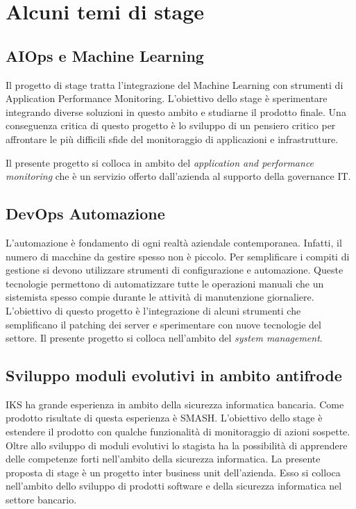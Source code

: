 \section{Alcuni temi di stage}
\subsection{AIOps e Machine Learning}
Il progetto di stage tratta l'integrazione del Machine Learning con 
strumenti di Application Performance Monitoring. L'obiettivo dello 
stage è sperimentare integrando diverse soluzioni in questo ambito e 
studiarne il prodotto finale. Una conseguenza critica di questo progetto 
è lo sviluppo di un pensiero critico per affrontare le più difficili sfide 
del monitoraggio di applicazioni e infrastrutture. 

Il presente progetto si colloca in ambito del \textit{application and performance monitoring} che è un servizio offerto dall'azienda al supporto della governance IT.


\subsection{DevOps Automazione}
L'automazione è fondamento di ogni realtà aziendale contemporanea. Infatti, 
il numero di macchine da gestire spesso non è piccolo. Per semplificare i 
compiti di gestione si devono utilizzare strumenti di configurazione e
automazione. Queste tecnologie permettono di automatizzare tutte le operazioni 
manuali che un sistemista spesso compie durante le attività di manutenzione 
giornaliere. L'obiettivo di questo progetto è l'integrazione di alcuni strumenti che semplificano il \gls{patching} dei server e sperimentare con nuove tecnologie del settore.
Il presente progetto si colloca nell'ambito del \textit{system management}. 

\subsection{Sviluppo moduli evolutivi in ambito antifrode}
IKS ha grande esperienza in ambito della sicurezza informatica bancaria. 
Come prodotto risultate di questa esperienza è SMASH. L'obiettivo dello 
stage è estendere il prodotto con qualche funzionalità di monitoraggio di 
azioni sospette. Oltre allo sviluppo di moduli evolutivi lo stagista ha 
la possibilità di apprendere delle competenze forti nell'ambito della 
sicurezza informatica. 
La presente proposta di stage è un progetto inter business unit dell'azienda. 
Esso si colloca nell'ambito dello sviluppo di prodotti software e della sicurezza
informatica nel settore bancario.


